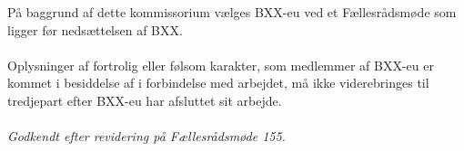 På baggrund af dette kommissorium vælges BXX-eu ved et Fællesrådsmøde som ligger før nedsættelsen af BXX.\\
\\
Oplysninger af fortrolig eller følsom karakter, som medlemmer af BXX-eu er kommet i besiddelse af i forbindelse med arbejdet, må ikke viderebringes til tredjepart efter BXX-eu har afsluttet sit arbejde. 
\\
\\
\textit{Godkendt efter revidering på Fællesrådsmøde 155.}
